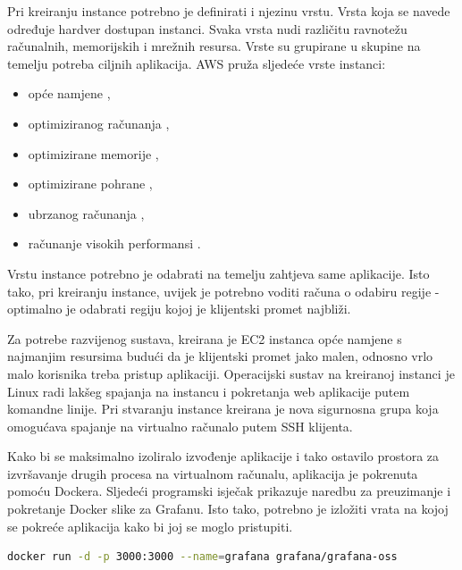 Pri kreiranju instance potrebno je definirati i njezinu vrstu. Vrsta koja se navede određuje hardver dostupan instanci. Svaka vrsta nudi različitu ravnotežu računalnih, memorijskih i mrežnih resursa. Vrste su grupirane u skupine na temelju potreba ciljnih aplikacija. AWS pruža sljedeće vrste instanci:
\begin{itemize}
	\item opće namjene , 
	\item optimiziranog računanja ,
	\item optimizirane memorije ,
	\item optimizirane pohrane , 
	\item ubrzanog računanja ,
	\item računanje visokih performansi .
\end{itemize}

Vrstu instance potrebno je odabrati na temelju zahtjeva same aplikacije. Isto tako, pri kreiranju instance, uvijek je potrebno voditi računa o odabiru regije - optimalno je odabrati regiju kojoj je klijentski promet najbliži.

Za potrebe razvijenog sustava, kreirana je EC2 instanca opće namjene s najmanjim resursima budući da je klijentski promet jako malen, odnosno vrlo malo korisnika treba pristup aplikaciji. Operacijski sustav na kreiranoj instanci je Linux radi lakšeg spajanja na instancu i pokretanja web aplikacije putem komandne linije. Pri stvaranju instance kreirana je nova sigurnosna grupa koja omogućava spajanje na virtualno računalo putem SSH klijenta.


Kako bi se maksimalno izoliralo izvođenje aplikacije i tako ostavilo prostora za izvršavanje drugih procesa na virtualnom računalu, aplikacija je pokrenuta pomoću Dockera. Sljedeći programski isječak prikazuje naredbu za preuzimanje i pokretanje Docker slike za Grafanu. Isto tako, potrebno je izložiti vrata na kojoj se pokreće aplikacija kako bi joj se moglo pristupiti. 

\begin{lstlisting}[caption={Pokretanje Docker slike za Grafanu}, language=bash]
docker run -d -p 3000:3000 --name=grafana grafana/grafana-oss
\end{lstlisting}


